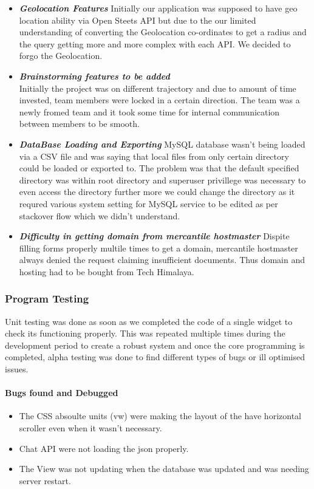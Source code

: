 \documentclass[12pt]{article}
\begin{document}
\begin{itemize}
    \item \textit{\textbf{Geolocation Features}}
        Initially our application was supposed to have geo location ability via Open Steets API but due to the our limited understanding of converting the Geolocation co-ordinates to get a radius and the query getting more and more complex with each API. We decided to forgo the Geolocation.
    \item \textit{\textbf{Brainstorming features to be added}}\\
        Initially the project was on different trajectory and due to amount of time invested, team members were locked in a certain direction. The team was a newly fromed team and it took some time for internal communication between members to be smooth.
    \item \textit{\textbf{DataBase Loading and Exporting}}
        MySQL database wasn't being loaded via a CSV file and was saying that local files from only certain directory could be loaded or exported to. The problem was that the default specified directory was within root directory and superuser privillege was necessary to even access the directory further more we could change the directory as it requred various system setting for MySQL service to be edited as per stackover flow which we didn't understand.
    \item \textit{\textbf{Difficulty in getting domain from mercantile hostmaster}}
        Dispite filling forms properly multile times to get a domain, mercantile hostmaster always denied the request claiming insufficient documents. Thus domain and hosting had to be bought from Tech Himalaya.
\end{itemize}
\subsubsection{Program Testing}
Unit testing was done as soon as we completed the code of a single widget to check its functioning properly. This was repeated multiple times during the development 
period to create a robust system and once the core programming is completed, alpha testing was done to find different types of bugs or ill optimised issues.
\paragraph{Bugs found and Debugged}
\begin{itemize}
    \item The CSS absoulte units (vw) were making the layout of the have horizontal scroller even when it wasn't necessary.
    \item Chat API were not loading the json properly.
    \item The View was not updating when the database was updated and was needing server restart.
\end{itemize}
\clearpage
\end{document}
